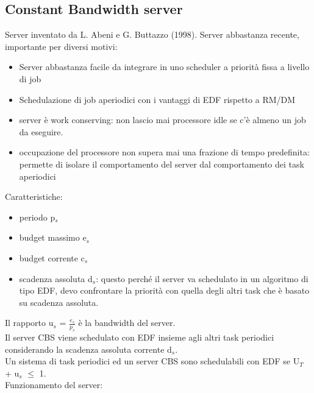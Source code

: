 \documentclass[12pt, oneside]{extbook}
\begin{document}
\subsection{Constant Bandwidth server}
Server inventato da L. Abeni e G. Buttazzo (1998). Server abbastanza recente, importante per diversi motivi:
\begin{itemize}
\item Server abbastanza facile da integrare in uno scheduler a priorità fissa a livello di job
\item Schedulazione di job aperiodici con i vantaggi di EDF rispetto a RM/DM
\item server è work conserving: non lascio mai processore idle se c'è almeno un job da eseguire.
\item occupazione del processore non supera mai una frazione di tempo predefinita: permette di isolare il comportamento del server dal comportamento dei task aperiodici
\end{itemize}
Caratteristiche:
\begin{itemize}
\item periodo p$_{s}$
\item budget massimo e$_{s}$
\item budget corrente c$_{s}$
\item scadenza assoluta d$_{s}$: questo perché il server va schedulato in un algoritmo di tipo EDF, devo confrontare la priorità con quella degli altri task che è basato su scadenza assoluta.
\end{itemize}
Il rapporto u$_{s}$ = $\frac{e_s}{p_s}$ è la bandwidth del server.\\ Il server CBS viene schedulato con EDF insieme agli altri task periodici considerando la scadenza assoluta corrente d$_{s}$.\\ Un sistema di task periodici ed un server CBS sono schedulabili con EDF se U$_{T}$ + u$_{s}$ $\leq$ 1.\\ Funzionamento del server:\\
\end{document}
